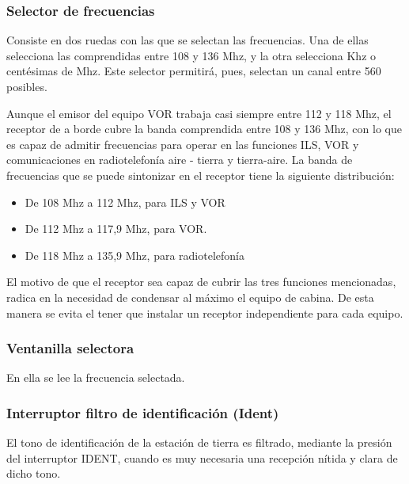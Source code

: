 \subsubsection{Selector de frecuencias}
Consiste en dos ruedas con las que se selectan las frecuencias. Una de ellas selecciona las comprendidas entre 108 y 136 Mhz, y la otra selecciona Khz o centésimas de Mhz. Este selector permitirá, pues, selectan un canal entre 560 posibles.

Aunque el emisor del equipo VOR trabaja casi siempre entre 112 y 118 Mhz, el receptor de a borde cubre la banda comprendida entre 108 y 136 Mhz, con lo que es capaz de admitir frecuencias para operar en las funciones ILS, VOR y comunicaciones en radiotelefonía aire - tierra y tierra-aire. La banda de frecuencias que se puede sintonizar en el receptor tiene la siguiente distribución:

\begin{itemize}
\item De 108 Mhz a 112 Mhz, para ILS y VOR 

\item De 112 Mhz a 117,9 Mhz, para VOR.

\item De 118 Mhz a 135,9 Mhz, para radiotelefonía

\end{itemize}

El motivo de que el receptor sea capaz de cubrir las tres funciones mencionadas, radica en la necesidad de condensar al máximo el equipo de cabina. De esta manera se evita el tener que instalar un receptor independiente para cada equipo.

\subsubsection{Ventanilla selectora}
En ella se lee la frecuencia selectada.

\subsubsection{Interruptor filtro de identificación (Ident)}
El tono de identificación de la estación de tierra es filtrado, mediante la presión del interruptor IDENT, cuando es muy necesaria una recepción nítida y clara de dicho tono.

